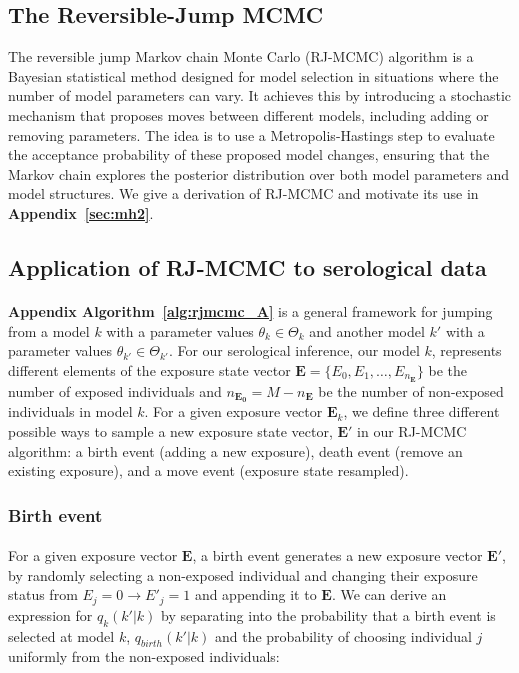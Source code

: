 \subsection{The Reversible-Jump MCMC}
The reversible jump Markov chain Monte Carlo (RJ-MCMC) algorithm\cite{Green1995-kh} is a Bayesian statistical method designed for model selection in situations where the number of model parameters can vary. It achieves this by introducing a stochastic mechanism that proposes moves between different models, including adding or removing parameters. The idea is to use a Metropolis-Hastings step to evaluate the acceptance probability of these proposed model changes, ensuring that the Markov chain explores the posterior distribution over both model parameters and model structures. We give a derivation of RJ-MCMC and motivate its use in \textbf{Appendix~\ref{sec:mh2}}.


\subsection{Application of RJ-MCMC to serological data}
\paragraph{}\textbf{Appendix Algorithm~\ref{alg:rjmcmc_A}} is a general framework for jumping from a model $k$ with a parameter values $\theta_k \in \Theta_k$ and another model $k'$ with a parameter values $\theta_{k'} \in \Theta_{k'}$. For our serological inference, our model $k$, represents different elements of the exposure state vector $\mathbf{E} = \{E_0, E_1, \dots, E_{n_\mathbf{E}}\}$ be the number of exposed individuals and $n_\mathbf{E_0} = M - n_\mathbf{E}$ be the number of non-exposed individuals in model $k$. For a given exposure vector $\mathbf{E}_k$, we define three different possible ways to sample a new exposure state vector, $\mathbf{E'}$ in our RJ-MCMC algorithm: a birth event (adding a new exposure), death event (remove an existing exposure), and a move event (exposure state resampled)\cite{Liang2010-oz, Gibson1998-re}. 

\subsubsection{Birth event}

\paragraph{}For a given exposure vector $\mathbf{E}$, a birth event generates a new exposure vector $\mathbf{E'}$, by randomly selecting a non-exposed individual and changing their exposure status from $E_j = 0 \rightarrow E'_j = 1$ and appending it to $\mathbf{E}$. We can derive an expression for $q_k(k' | k)$ by separating into the probability that a birth event is selected at model $k$, $q_{birth}(k' |k)$ and the probability of choosing individual $j$ uniformly from the non-exposed individuals:

